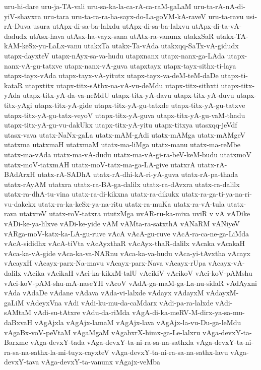{uru-hi-dare
uru-ja-TA-vali
uru-sa-ka-la-ca-rA-ca-raM-gaLaM
uru-ta-rA-nA-di-yiV-shavxra
uru-tara
uru-ta-ra-ra-ha-sayx-do-La-goVM-kA-raveV
uru-ta-ravu
usi-rA-Duva
usura
utApx-di-sa-ba-lalxdu
utApx-di-sa-ba-lalxvu
utApx-di-ta-vA-dadudx
utAsx-hava
utAsx-ha-vayx-sana
utAtx-ra-vanunx
utakxSaR
utakx-TA-kAM-keSx-yu-LaLx-vanu
utakxTa
utakx-Ta-vAda
utakxqq-SaTx-vA-gidudx
utapx-dayxteV
utapx-nAyx-sa-va-hudu
utapxnanx
utapx-nanx-ga-LAda
utapx-nanx-vA-gu-tatxve
utapx-nanx-vA-guva
utapxtayx
utapx-tayx-sithx-ti-laya
utapx-tayx-vAda
utapx-tayx-vA-yitutx
utapx-tayx-va-deM-teM-daDe
utapx-ti-kataR
utapxtitx
utapx-titx-sAthx-na-vA-vu-deMdu
utapx-titx-sithxti
utapx-titx-yAda
utapx-titx-yA-da-va-neMdU
utapx-titx-yA-davu
utapx-titx-yA-duvu
utapx-titx-yAgi
utapx-titx-yA-gide
utapx-titx-yA-gu-tatxde
utapx-titx-yA-gu-tatxve
utapx-titx-yA-gu-tatx-veyoV
utapx-titx-yA-guva
utapx-titx-yA-gu-vaM-thadu
utapx-titx-yA-gu-vu-dakUkx
utapx-titx-yA-yitu
utapx-titxya
utasxqq-jeVdf
utasx-vava
utatx-NaNx-gaLa
utatx-mAM-gAdi
utatx-mAMga
utatx-mAMgeV
utatxma
utatxmaH
utatxmaM
utatx-ma-liMga
utatx-manu
utatx-ma-reMbe
utatx-ma-vAda
utatx-ma-vA-dudu
utatx-ma-vA-gi-ra-beV-keM-budu
utatxmoV
utatx-moV-tatxmAH
utatx-moV-tatx-ma-ga-LA-give
utatxrA
utatx-rA-BAdArxH
utatx-rA-SADhA
utatx-rA-dhi-kA-ri-yA-guva
utatx-rA-pa-thada
utatx-rAyAM
utatxra
utatx-ra-BA-ga-dalilx
utatx-ra-dAvxra
utatx-ra-dalilx
utatx-ra-dhA-tu-vina
utatx-ra-di-kikxna
utatx-ra-dikukx
utatx-ra-ga-ti-ya-na-ri-vu-dakekx
utatx-ra-ka-keSx-ya-na-ritu
utatx-ra-muKa
utatx-ra-vA-tula
utatx-rava
utatxreV
utatx-roV-tatxra
ututxMga
uvAR-ru-ka-miva
uviR
v
vA
vADike
vADi-ke-ya-lilxve
vADi-ke-yide
vAM
vAMta-ra-satxthA
vANaRM
vANiyeV
vARga-moV-katx-ka-LA-gu-ruve
vAcA
vAcA-gu-ruve
vAcA-ra-ca-ne-ga-LiMda
vAcA-sididhx
vAcA-tiVta
vAcAyxthaR
vAcAyx-thaR-dalilx
vAcaka
vAcakaH
vAca-ka-vA-gide
vAca-ka-va-NARnu
vAca-ka-va-hudu
vAca-yi-tAvxtha
vAcayx
vAcayxH
vAcayx-parx-Na-mavu
vAcayx-parx-Nava
vAcayx-rUpa
vAcayx-vA-dalilx
vAcika
vAcikaH
vAci-ka-kikxM-talU
vAcikiV
vAcikoV
vAci-koV-pAMshu
vAci-koV-pAM-shu-mA-naseYH
vAcoV
vAdA-ga-maM-ga-La-nu-sidaR
vAdAyxni
vAda
vAdaDe
vAdane
vAdava
vAda-vi-lalxde
vAdayx
vAdayxM
vAdayxM-gaLiM
vAdeyxVna
vAdi
vAdi-ku-mu-da-caMdarx
vAdi-pa-ra-lalxde
vAdi-sAMtaM
vAdi-su-tAtxre
vAdu-da-riMda
vAgA-di-ka-meRV-M-dirx-ya-sa-mu-daBxvaH
vAgAjxla
vAgAjx-lamaM
vAgAjx-lava
vAgAjx-la-vu-Du-ga-leMdu
vAgaBx-voV-peVtaM
vAgaMgaM
vAgabxrX-himx-ga-Le-lalxru
vAga-devxY-ta-Barxme
vAga-devxY-tada
vAga-devxY-ta-ni-ra-sa-na-sathxla
vAga-devxY-ta-ni-ra-sa-na-sathx-la-mi-tuyx-cayxteV
vAga-devxY-ta-ni-ra-sa-na-sathx-lavu
vAga-devxY-tava
vAga-devxY-ta-vanunx
vAgajx-veMba
}
